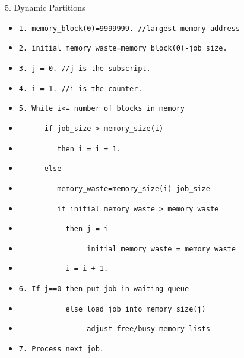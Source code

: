 \begin{slide}{ 5. Dynamic Partitions}
 \begin{itemize}
 \item {\tt 1. memory\_block(0)=9999999. //largest memory address}
 \item {\tt 2. initial\_memory\_waste=memory\_block(0)-job\_size.}
 \item {\tt 3. j = 0. //j is the subscript.}
 \item {\tt 4. i = 1. //i is the counter.}
 \item {\tt 5. While i<= number of blocks in memory}
 \item {\tt ~~~~~~if job\_size > memory\_size(i)}
 \item {\tt ~~~~~~~~~then i = i + 1.}
 \item {\tt ~~~~~~else}
 \item {\tt ~~~~~~~~~memory\_waste=memory\_size(i)-job\_size}
 \item {\tt ~~~~~~~~~if initial\_memory\_waste > memory\_waste}
 \item {\tt ~~~~~~~~~~~then j = i}
 \item {\tt ~~~~~~~~~~~~~~~~initial\_memory\_waste = memory\_waste}
 \item {\tt ~~~~~~~~~~~i = i + 1.}
 \item {\tt 6. If j==0 then put job in waiting queue}
 \item {\tt ~~~~~~~~~~~else load job into memory\_size(j)}
 \item {\tt ~~~~~~~~~~~~~~~~adjust free/busy memory lists}
 \item {\tt 7. Process next job.}
 \end{itemize}
\end{slide}
